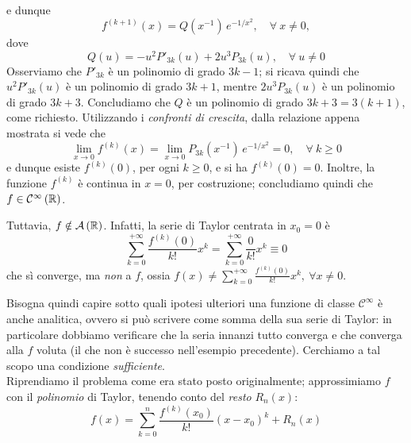 \begin{examplewt}
\begin{itemize}
\begin{equation*}
\end{equation*}
e dunque
\begin{equation*}
	f^{(k+1)}(x)=Q(x^{-1})\, e^{-1/x^2},\quad \forall \ x\neq 0,
\end{equation*}
dove
\begin{equation*}
	Q(u)=- u^2 P'_{3k}(u) +2u^3 P_{3k}(u),\quad \forall \ u\neq 0
\end{equation*}
Osserviamo che $P'_{3k}$ è un polinomio di grado $3k-1$; si ricava quindi che $u^2P'_{3k}\left(u\right)$ è un polinomio di grado $3k+1$, mentre $2u^3P_{3k}\left(u\right)$ è un polinomio di grado $3k+3$. Concludiamo che $Q$ è un polinomio di grado $3k+3=3\left(k+1\right)$, come richiesto.
Utilizzando i \textit{confronti di crescita}, dalla relazione appena mostrata si vede che
\begin{equation*}
\lim_{x\to 0} f^{(k)}(x)=\lim_{x\to 0} P_{3k}(x^{-1})\, e^{-1/x^2}=0,\quad \forall \ k\geq 0
\end{equation*}
e dunque esiste $f^{(k)}(0)$, per ogni $k\geq 0$, e si ha $f^{(k)}(0)=0$. Inoltre, la funzione $f^{(k)}$ è continua in $x=0$, per costruzione; concludiamo quindi che $f\in \mathcal{C}^{\infty}\left(\mathbb{R}\right)$.
\end{itemize}
Tuttavia, $f\notin\mathcal{A}\left(\mathbb{R}\right)$. Infatti, la serie di Taylor centrata in $x_0=0$ è
\begin{equation*}
	\sum_{k=0}^{+\infty}\frac{f^{\left(k\right)}\left(0\right)}{k!}x^k=\sum_{k=0}^{+\infty}\frac{0}{k!}x^k\equiv 0
\end{equation*}
che sì converge, ma \textit{non} a $f$, ossia $\displaystyle f\left(x\right)\neq \sum_{k=0}^{+\infty}\frac{f^{\left(k\right)}\left(0\right)}{k!}x^k,\ \forall x\neq 0$.
\end{examplewt}
Bisogna quindi capire sotto quali ipotesi ulteriori una funzione di classe $\mathcal{C}^{\infty}$ è anche analitica, ovvero si può scrivere come somma della sua serie di Taylor: in particolare dobbiamo verificare che la seria innanzi tutto converga e che converga alla $f$ voluta (il che non è successo nell'esempio precedente). Cerchiamo a tal scopo una condizione \textit{sufficiente}.\\
Riprendiamo il problema come era stato posto originalmente; approssimiamo $f$ con il \textit{polinomio} di Taylor, tenendo conto del \textit{resto} $R_n\left(x\right)$:
\begin{equation*}
	f\left(x\right)=\sum_{k=0}^{n}\frac{f^{\left(k\right)}\left(x_0\right)}{k!}\left(x-x_0\right)^k+R_n\left(x\right)
\end{equation*}
